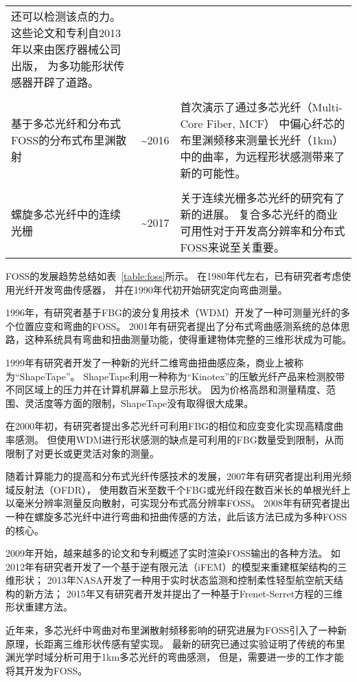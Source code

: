 \begin{table}
\begin{center}
\begin{tabular}{p{}cp{}}
还可以检测该点的力。这些论文和专利自2013年以来由医疗器械公司出版，
为多功能形状传感器开辟了道路。
\\
\\
基于多芯光纤和分布式FOSS的分布式布里渊散射 & \textasciitilde 2016 & 首次演示了通过多芯光纤（Multi-Core Fiber, MCF）
中偏心纤芯的布里渊频移来测量长光纤（1km）中的曲率，为远程形状感测带来了新的可能性。
\\
\\
螺旋多芯光纤中的连续光栅 & \textasciitilde 2017 & 关于连续光栅多芯光纤的研究有了新的进展。
复合多芯光纤的商业可用性对于开发高分辨率和分布式FOSS来说至关重要。
\\
\bottomrule
\end{tabular}
\end{center}
\end{table}

FOSS的发展趋势总结如表~\ref{table:foss}所示。
在1980年代左右，已有研究者考虑使用光纤开发弯曲传感器，
并在1990年代初开始研究定向弯曲测量。

1996年，有研究者基于FBG的波分复用技术（WDM）开发了一种可测量光纤的多个位置应变和弯曲的FOSS。 
2001年有研究者提出了分布式弯曲感测系统的总体思路，这种系统具有弯曲和扭曲测量功能，使得重建物体完整的三维形状成为可能。

1999年有研究者开发了一种新的光纤二维弯曲扭曲感应条，商业上被称为“ShapeTape”\cite{ShapeTape}。
ShapeTape利用一种称为“Kinotex”的压敏光纤产品来检测胶带不同区域上的压力并在计算机屏幕上显示形状。
因为价格高昂和测量精度、范围、灵活度等方面的限制，ShapeTape没有取得很大成果。

在2000年初，有研究者提出多芯光纤可利用FBG的相位和应变变化实现高精度曲率感测。
但使用WDM进行形状感测的缺点是可利用的FBG数量受到限制，从而限制了对更长或更灵活对象的测量。

随着计算能力的提高和分布式光纤传感技术的发展，2007年有研究者提出利用光频域反射法（OFDR），
使用数百米至数千个FBG或光纤段在数百米长的单根光纤上以毫米分辨率测量反向散射，可实现分布式高分辨率FOSS。
2008年有研究者提出一种在螺旋多芯光纤中进行弯曲和扭曲传感的方法，此后该方法已成为多种FOSS的核心。

2009年开始，越来越多的论文和专利概述了实时渲染FOSS输出的各种方法。
如2012年有研究者开发了一个基于逆有限元法（iFEM）的模型来重建框架结构的三维形状；
2013年NASA开发了一种用于实时状态监测和控制柔性轻型航空航天结构的新方法；
2015年又有研究者开发并提出了一种基于Frenet-Serret方程的三维形状重建方法。

近年来，多芯光纤中弯曲对布里渊散射频移影响的研究进展为FOSS引入了一种新原理，长距离三维形状传感有望实现。
最新的研究已通过实验证明了传统的布里渊光学时域分析可用于1km多芯光纤的弯曲感测，
但是，需要进一步的工作才能将其开发为FOSS。

